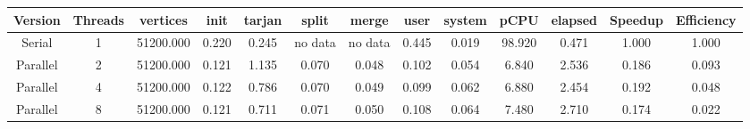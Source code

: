 \begin{tabular}{|c|c|c|c|c|c|c|c|c|c|c|c|c|}
\toprule
 Version &  Threads &  vertices &  init &  tarjan &   split &   merge &  user &  system &   pCPU &  elapsed &  Speedup &  Efficiency \\
\midrule
  Serial &        1 & 51200.000 & 0.220 &   0.245 & no data & no data & 0.445 &   0.019 & 98.920 &    0.471 &    1.000 &       1.000 \\
Parallel &        2 & 51200.000 & 0.121 &   1.135 &   0.070 &   0.048 & 0.102 &   0.054 &  6.840 &    2.536 &    0.186 &       0.093 \\
Parallel &        4 & 51200.000 & 0.122 &   0.786 &   0.070 &   0.049 & 0.099 &   0.062 &  6.880 &    2.454 &    0.192 &       0.048 \\
Parallel &        8 & 51200.000 & 0.121 &   0.711 &   0.071 &   0.050 & 0.108 &   0.064 &  7.480 &    2.710 &    0.174 &       0.022 \\
\bottomrule
\end{tabular}
